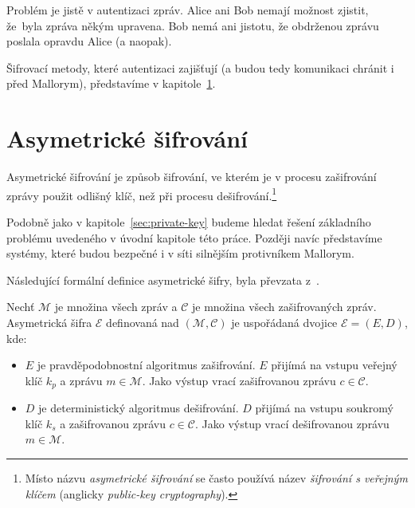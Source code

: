 \documentclass[
  program=infoi,
  biblatex=false,
  figures=true,
  glossaries,
  tables=false,
  sourcecodes=true,
  index
]{kidiplom}
\begin{document}
    Problém je jistě v autentizaci zpráv.
    Alice ani Bob nemají možnost zjistit, že~byla zpráva někým upravena.
    Bob nemá ani jistotu, že obdrženou zprávu poslala opravdu Alice (a naopak).

    Šifrovací metody, které autentizaci zajišťují (a budou tedy komunikaci chránit i před Mallorym), představíme v kapitole~\ref{sec:public-key}.

    \newpage
    

\section{Asymetrické šifrování}\label{sec:public-key}

        
    Asymetrické šifrování je způsob šifrování, ve kterém je v procesu zašifrování zprávy použit
    odlišný klíč, než při procesu dešifrování.\footnote{Místo názvu \emph{asymetrické šifrování} se často
    používá název \emph{šifrování s veřejným klíčem} (anglicky \emph{public-key cryptography}).}

    Podobně jako v kapitole~\ref{sec:private-key} budeme hledat řešení základního problému uvedeného v úvodní kapitole této práce.
    Později navíc představíme systémy, které budou bezpečné i v síti silnějším protivníkem Mallorym.

    Následující formální definice asymetrické šifry, byla převzata z~\cite{graduate-course}.

    \begin{definition}
        Nechť $\mathcal{M}$ je množina všech zpráv a $\mathcal{C}$ je množina všech zašifrovaných zpráv.
        Asymetrická šifra $\mathcal{E}$ definovaná nad $(\mathcal{M},\mathcal{C})$
        je uspořádaná dvojice $\mathcal{E}  = (E, D)$, kde:

        \begin{itemize}
            \item
                $E$ je pravděpodobnostní algoritmus zašifrování.
                $E$ přijímá na vstupu veřejný klíč $k_p$ a zprávu $m \in \mathcal{M}$.
                Jako výstup vrací zašifrovanou zprávu $c \in \mathcal{C}$.

            \item
                $D$ je deterministický algoritmus dešifrování.
                $D$ přijímá na vstupu soukromý klíč $k_s$ a zašifrovanou zprávu $c \in \mathcal{C}$.
                Jako výstup vrací dešifrovanou zprávu $m \in \mathcal{M}$.
        \end{itemize}
    \end{definition}
\end{document}
